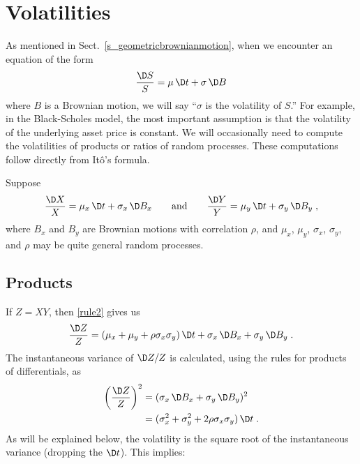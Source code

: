 \section{Volatilities}\label{s_volatilities}

As mentioned in Sect.~\ref{s_geometricbrownianmotion}, when we encounter an equation of the form 
$$\frac{\D S}{S} = \mu\,\D t + \sigma\,\D B$$
where $B$ is a Brownian motion, we will say  ``$\sigma$ is the volatility of $S$.''  For example, in the Black-Scholes model, the most important assumption is that the volatility of the underlying asset price is constant.  We will occasionally need to compute the volatilities of products or ratios of random processes.  These computations follow directly from It\^o's formula.

Suppose 
$$\frac{\D X}{X} = \mu_x\,\D t + \sigma_x\,\D B_x \qquad \text{and} \qquad 
\frac{\D Y}{Y} = \mu_y\,\D t + \sigma_y\,\D B_y\; ,$$
where $B_x$ and $B_y$ are Brownian motions with correlation $\rho$, and $\mu_x$, $\mu_y$, $\sigma_x$, $\sigma_y$, and $\rho$ may be quite general random processes.  

\subsection*{Products}
If $Z=XY$, then \eqref{rule2} gives us
\begin{equation}\label{volproduct1}
\frac{\D Z}{Z} = (\mu_x+\mu_y+\rho\sigma_x\sigma_y)\,\D t + \sigma_x\,\D B_x + \sigma_y\,\D B_y\;.
\end{equation}
The instantaneous variance of $\D Z/Z$ is calculated, using the rules for products of differentials, as
\begin{align*}
\left(\frac{\D Z}{Z}\right)^2 &= (\sigma_x\,\D B_x + \sigma_y\,\D B_y)^2\\
&= (\sigma_x^2 + \sigma_y^2 + 2\rho\sigma_x\sigma_y)\,\D t\;.
\end{align*}
As will be explained below, the volatility is the square root of the instantaneous variance (dropping the $\D t$).  This implies:


